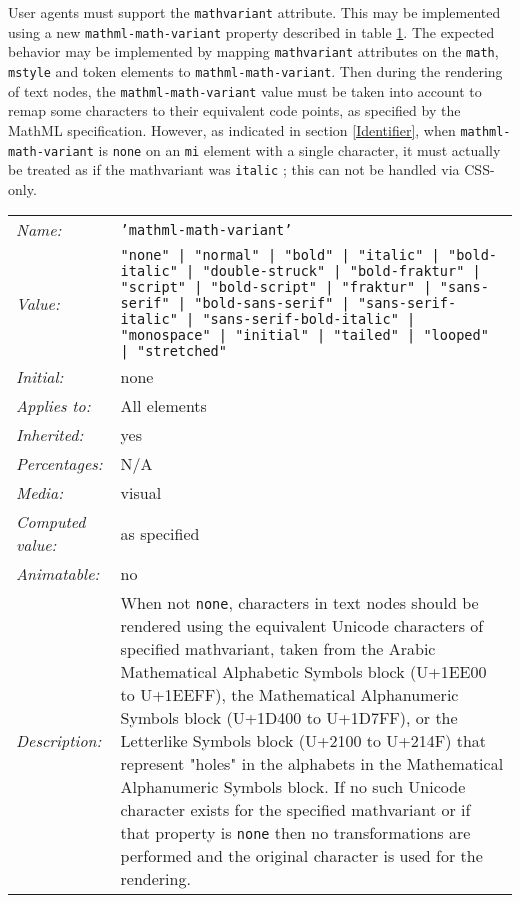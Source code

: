 User agents must support the {\tt mathvariant} attribute. This may be
implemented using a new {\tt mathml-math-variant} property described in
table \ref{tab:CSSMathVariant}. The expected behavior may be implemented by
mapping {\tt mathvariant} attributes on the {\tt math}, {\tt mstyle} and token
elements to {\tt mathml-math-variant}. Then during the rendering of text nodes,
the {\tt mathml-math-variant} value must be taken into account to remap
some characters to their equivalent code points, as specified by the MathML
specification. However, as indicated in section \ref{Identifier}, when
{\tt mathml-math-variant} is {\tt none} on an {\tt mi} element with a single
character, it must actually be treated as if the mathvariant was {\tt italic} ;
this can not be handled via CSS-only.

\begin{table}
\begin{tabular}{ll}
  \emph{Name:} & {\tt 'mathml-math-variant'} \\
  \emph{Value:} & {\tt "none" | "normal" | "bold" | "italic" | "bold-italic" |
  "double-struck" | "bold-fraktur" | "script" | "bold-script" | "fraktur" |
  "sans-serif" | "bold-sans-serif" | "sans-serif-italic" |
  "sans-serif-bold-italic" | "monospace" | "initial" | "tailed" | "looped" |
  "stretched"} \\
  \emph{Initial:} & none \\
  \emph{Applies to:} & All elements \\
  \emph{Inherited:} & yes \\
  \emph{Percentages:} & N/A \\
  \emph{Media:} & visual \\
  \emph{Computed value:} & as specified \\
  \emph{Animatable:} & no \\
  \emph{Description:} & When not {\tt none}, characters in text nodes
  should be rendered using the equivalent Unicode characters of specified
  mathvariant, taken from the Arabic Mathematical Alphabetic Symbols block
  (U+1EE00 to U+1EEFF), the Mathematical Alphanumeric Symbols block
  (U+1D400 to U+1D7FF), or the Letterlike Symbols block (U+2100 to U+214F)
  that represent "holes" in the alphabets in the
  Mathematical Alphanumeric Symbols block. If no such Unicode character
  exists for the specified mathvariant or if that property is {\tt none} then
  no transformations are performed and the original character is used for the
  rendering.
\end{tabular}
\label{tab:CSSMathVariant}
\end{table}

